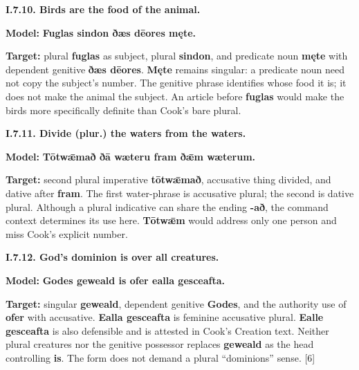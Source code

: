 \par\begin{minipage}{\linewidth}\raggedright
\textbf{I.7.10. Birds are the food of the animal.}

\textbf{Model:} \textbf{Fuglas sindon ðæs dēores męte.}

\textbf{Target:} plural \textbf{fuglas} as subject, plural \textbf{sindon}, and predicate noun \textbf{męte} with dependent genitive \textbf{ðæs dēores}. \textbf{Męte} remains singular: a predicate noun need not copy the subject’s number. The genitive phrase identifies whose food it is; it does not make the animal the subject. An article before \textbf{fuglas} would make the birds more specifically definite than Cook’s bare plural.

\end{minipage}\par\addvspace{4pt}

\par\begin{minipage}{\linewidth}\raggedright
\textbf{I.7.11. Divide (plur.) the waters from the waters.}

\textbf{Model:} \textbf{Tōtwǣmað ðā wæteru fram ðǣm wæterum.}

\textbf{Target:} second plural imperative \textbf{tōtwǣmað}, accusative thing divided, and dative after \textbf{fram}. The first water-phrase is accusative plural; the second is dative plural. Although a plural indicative can share the ending \textbf{-að}, the command context determines its use here. \textbf{Tōtwǣm} would address only one person and miss Cook’s explicit number.

\end{minipage}\par\addvspace{4pt}

\par\begin{minipage}{\linewidth}\raggedright
\textbf{I.7.12. God's dominion is over all creatures.}

\textbf{Model:} \textbf{Godes geweald is ofer ealla gesceafta.}

\textbf{Target:} singular \textbf{geweald}, dependent genitive \textbf{Godes}, and the authority use of \textbf{ofer} with accusative. \textbf{Ealla gesceafta} is feminine accusative plural. \textbf{Ealle gesceafta} is also defensible and is attested in Cook’s Creation text. Neither plural creatures nor the genitive possessor replaces \textbf{geweald} as the head controlling \textbf{is}. The form does not demand a plural “dominions” sense. [6]

\end{minipage}\par\addvspace{4pt}

